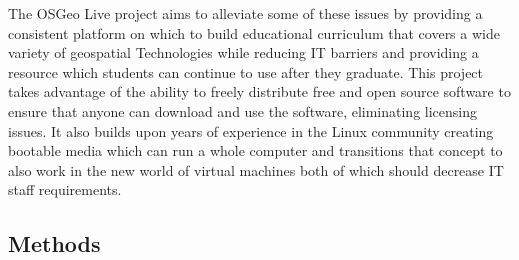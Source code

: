 \documentclass[12pt,letterpaper]{article}
\begin{document}
	The OSGeo Live project aims to alleviate some of these issues by providing a consistent platform on which to build educational curriculum that covers a wide variety of geospatial Technologies while reducing IT barriers and providing a resource which students can continue to use after they graduate. This project takes advantage of the ability to freely distribute free and open source software to ensure that anyone can download and use the software, eliminating licensing issues. It also builds upon years of experience in the Linux community creating bootable media \parencite{Negus2006,Knopper2006} which can run a whole computer and transitions that concept to also work in the new world of virtual machines both of which should decrease IT staff requirements.

%


\subsection{Methods}
\end{document}
